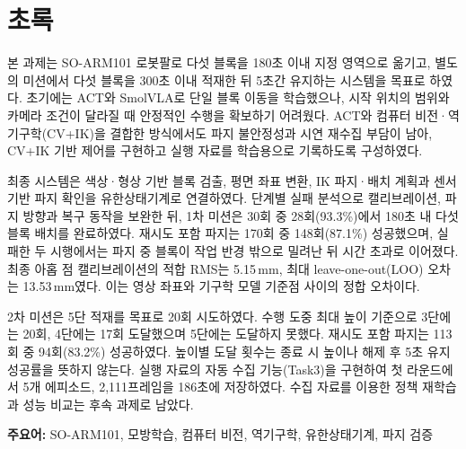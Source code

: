\chapter*{초록}
\thispagestyle{plain}
본 과제는 SO-ARM101 로봇팔로 다섯 블록을 180초 이내 지정 영역으로 옮기고, 별도의 미션에서 다섯 블록을 300초 이내 적재한 뒤 5초간 유지하는 시스템을 목표로 하였다. 초기에는 ACT와 SmolVLA로 단일 블록 이동을 학습했으나, 시작 위치의 범위와 카메라 조건이 달라질 때 안정적인 수행을 확보하기 어려웠다. ACT와 컴퓨터 비전·역기구학(CV+IK)을 결합한 방식에서도 파지 불안정성과 시연 재수집 부담이 남아, CV+IK 기반 제어를 구현하고 실행 자료를 학습용으로 기록하도록 구성하였다.

최종 시스템은 색상·형상 기반 블록 검출, 평면 좌표 변환, IK 파지·배치 계획과 센서 기반 파지 확인을 유한상태기계로 연결하였다. 단계별 실패 분석으로 캘리브레이션, 파지 방향과 복구 동작을 보완한 뒤, 1차 미션은 30회 중 28회(93.3\%)에서 180초 내 다섯 블록 배치를 완료하였다. 재시도 포함 파지는 170회 중 148회(87.1\%) 성공했으며, 실패한 두 시행에서는 파지 중 블록이 작업 반경 밖으로 밀려난 뒤 시간 초과로 이어졌다. 최종 아홉 점 캘리브레이션의 적합 RMS는 5.15\,mm, 최대 leave-one-out(LOO) 오차는 13.53\,mm였다. 이는 영상 좌표와 기구학 모델 기준점 사이의 정합 오차이다.

2차 미션은 5단 적재를 목표로 20회 시도하였다. 수행 도중 최대 높이 기준으로 3단에는 20회, 4단에는 17회 도달했으며 5단에는 도달하지 못했다. 재시도 포함 파지는 113회 중 94회(83.2\%) 성공하였다. 높이별 도달 횟수는 종료 시 높이나 해제 후 5초 유지 성공률을 뜻하지 않는다. 실행 자료의 자동 수집 기능(Task3)을 구현하여 첫 라운드에서 5개 에피소드, 2{,}111프레임을 186초에 저장하였다. 수집 자료를 이용한 정책 재학습과 성능 비교는 후속 과제로 남았다.

\medskip
\noindent\textbf{주요어:} SO-ARM101, 모방학습, 컴퓨터 비전, 역기구학, 유한상태기계, 파지 검증
